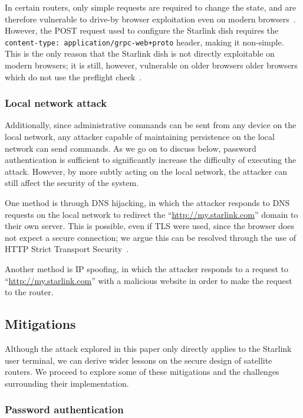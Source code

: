 In certain routers, only simple requests are required to change the state, and are therefore vulnerable to drive-by browser exploitation even on modern browsers~\cite{csrf_internal_network}.
However, the POST request used to configure the Starlink dish requires the \texttt{content-type: application/grpc-web+proto} header, making it non-simple.
This is the only reason that the Starlink dish is not directly exploitable on modern browsers; it is still, however, vulnerable on older browsers older browsers which do not use the preflight check~\cite{cors_w3c}.

\subsubsection{Local network attack}

Additionally, since administrative commands can be sent from any device on the local network, any attacker capable of maintaining persistence on the local network can send commands.
As we go on to discuss below, password authentication is sufficient to significantly increase the difficulty of executing the attack.
However, by more subtly acting on the local network, the attacker can still affect the security of the system.

One method is through DNS hijacking, in which the attacker responds to DNS requests on the local network to redirect the ``\url{http://my.starlink.com}'' domain to their own server.
This is possible, even if TLS were used, since the browser does not expect a secure connection; we argue this can be resolved through the use of HTTP Strict Transport Security~\cite{rfc6797}.

Another method is IP spoofing, in which the attacker responds to a request to ``\url{http://my.starlink.com}'' with a malicious website in order to make the request to the router.

\subsection{Mitigations}

Although the attack explored in this paper only directly applies to the Starlink user terminal, we can derive wider lessons on the secure design of satellite routers.
We proceed to explore some of these mitigations and the challenges surrounding their implementation.

\subsubsection{Password authentication}\label{sec:password_authentication}

